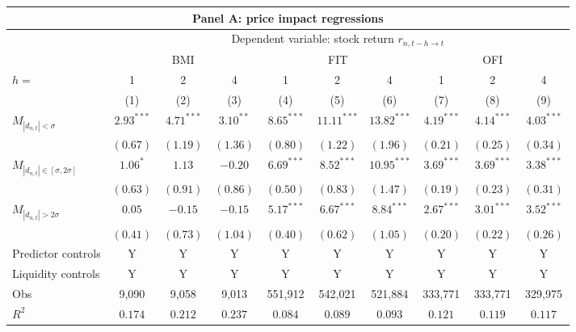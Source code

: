 \begin{tabular}{lccccccccc}
  \hline \multicolumn{10}{c}{Panel A: price impact regressions} \\
 \hline 
                                    & \multicolumn{9}{c}{Dependent variable: stock return $r_{n,t-h \rightarrow t}$} \\

                                    \cmidrule(l){2-10} & \multicolumn{3}{c}{BMI} & \multicolumn{3}{c}{FIT} & \multicolumn{3}{c}{OFI} \\
  \cmidrule(l){2-4} \cmidrule(l){5-7} \cmidrule(l){8-10} $h=$ & 1 & 2 & 4 & 1 & 2 & 4 & 1 & 2 & 4 \\
 
                                    \cmidrule(l){2-4} \cmidrule(l){5-7} \cmidrule(l){8-10} 
  & (1) & (2) & (3) & (4) & (5) & (6) & (7) & (8) & (9) \\ 
  $M_{|d_{n,t}| < \sigma}$ & $2.93^{***}$ & $4.71^{***}$ & $3.10^{**}$ & $8.65^{***}$ & $11.11^{***}$ & $13.82^{***}$ & $4.19^{***}$ & $4.14^{***}$ & $4.03^{***}$ \\ 
   & $(0.67)$ & $(1.19)$ & $(1.36)$ & $(0.80)$ & $(1.22)$ & $(1.96)$ & $(0.21)$ & $(0.25)$ & $(0.34)$ \\ 
  $M_{|d_{n,t}| \in [\sigma, 2\sigma]}$ & $1.06^{*}$ & $1.13$ & $-0.20$ & $6.69^{***}$ & $8.52^{***}$ & $10.95^{***}$ & $3.69^{***}$ & $3.69^{***}$ & $3.38^{***}$ \\ 
   & $(0.63)$ & $(0.91)$ & $(0.86)$ & $(0.50)$ & $(0.83)$ & $(1.47)$ & $(0.19)$ & $(0.23)$ & $(0.31)$ \\ 
  $M_{|d_{n,t}| > 2 \sigma}$ & $0.05$ & $-0.15$ & $-0.15$ & $5.17^{***}$ & $6.67^{***}$ & $8.84^{***}$ & $2.67^{***}$ & $3.01^{***}$ & $3.52^{***}$ \\ 
   \vspace{5pt} & $(0.41)$ & $(0.73)$ & $(1.04)$ & $(0.40)$ & $(0.62)$ & $(1.05)$ & $(0.20)$ & $(0.22)$ & $(0.26)$ \\ 
  Predictor controls & Y & Y & Y & Y & Y & Y & Y & Y & Y \\ 
   \vspace{5pt}Liquidity controls & Y & Y & Y & Y & Y & Y & Y & Y & Y \\ 
  Obs & 9,090 & 9,058 & 9,013 & 551,912 & 542,021 & 521,884 & 333,771 & 333,771 & 329,975 \\ 
  $R^2$ & $0.174$ & $0.212$ & $0.237$ & $0.084$ & $0.089$ & $0.093$ & $0.121$ & $0.119$ & $0.117$ \\ 

\end{tabular}
